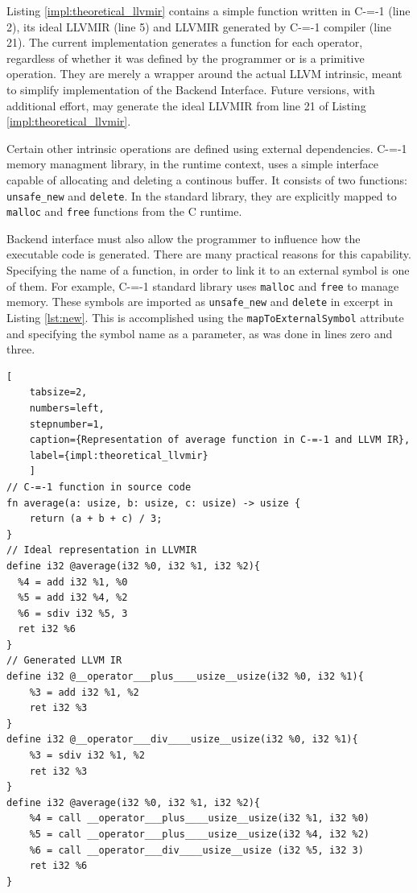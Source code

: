 Listing \ref{impl:theoretical_llvmir} contains a simple function written in C-=-1 (line 2), its ideal LLVMIR (line 5) and LLVMIR generated by C-=-1 compiler (line 21).
The current implementation generates a function for each operator, regardless of whether it was defined by the programmer or is a primitive operation.
They are merely a wrapper around the actual LLVM intrinsic, meant to simplify implementation of the Backend Interface.
Future versions, with additional effort, may generate the ideal LLVMIR from line 21 of Listing \ref{impl:theoretical_llvmir}.

Certain other intrinsic operations are defined using external dependencies.
C-=-1 memory managment library, in the runtime context, uses a simple interface capable of allocating and deleting a continous buffer.
It consists of two functions: \lstinline{unsafe_new} and \lstinline{delete}.
In the standard library, they are explicitly mapped to \lstinline{malloc} and \lstinline{free} functions from the C runtime.

Backend interface must also allow the programmer to influence how the executable code is generated.
There are many practical reasons for this capability.
Specifying the name of a function, in order to link it to an external symbol is one of them.
For example, C-=-1 standard library uses \lstinline{malloc} and \lstinline{free} to manage memory.
These symbols are imported as \lstinline{unsafe_new} and \lstinline{delete} in excerpt in Listing \ref{lst:new}.
This is accomplished using the \lstinline{mapToExternalSymbol} attribute and specifying the symbol name as a parameter, as was done in lines zero and three.

\begin{minipage}{\linewidth}
	\begin{lstlisting}[
	tabsize=2,
	numbers=left,
	stepnumber=1,
	caption={Representation of average function in C-=-1 and LLVM IR},
	label={impl:theoretical_llvmir}
	]
// C-=-1 function in source code
fn average(a: usize, b: usize, c: usize) -> usize {
	return (a + b + c) / 3;
}
// Ideal representation in LLVMIR
define i32 @average(i32 %0, i32 %1, i32 %2){
  %4 = add i32 %1, %0
  %5 = add i32 %4, %2
  %6 = sdiv i32 %5, 3
  ret i32 %6
}
// Generated LLVM IR
define i32 @__operator___plus____usize__usize(i32 %0, i32 %1){
	%3 = add i32 %1, %2
	ret i32 %3
}
define i32 @__operator___div____usize__usize(i32 %0, i32 %1){
	%3 = sdiv i32 %1, %2
	ret i32 %3
}
define i32 @average(i32 %0, i32 %1, i32 %2){
	%4 = call __operator___plus____usize__usize(i32 %1, i32 %0)
	%5 = call __operator___plus____usize__usize(i32 %4, i32 %2)
	%6 = call __operator___div____usize__usize (i32 %5, i32 3)
	ret i32 %6
}
\end{lstlisting}
\end{minipage}



